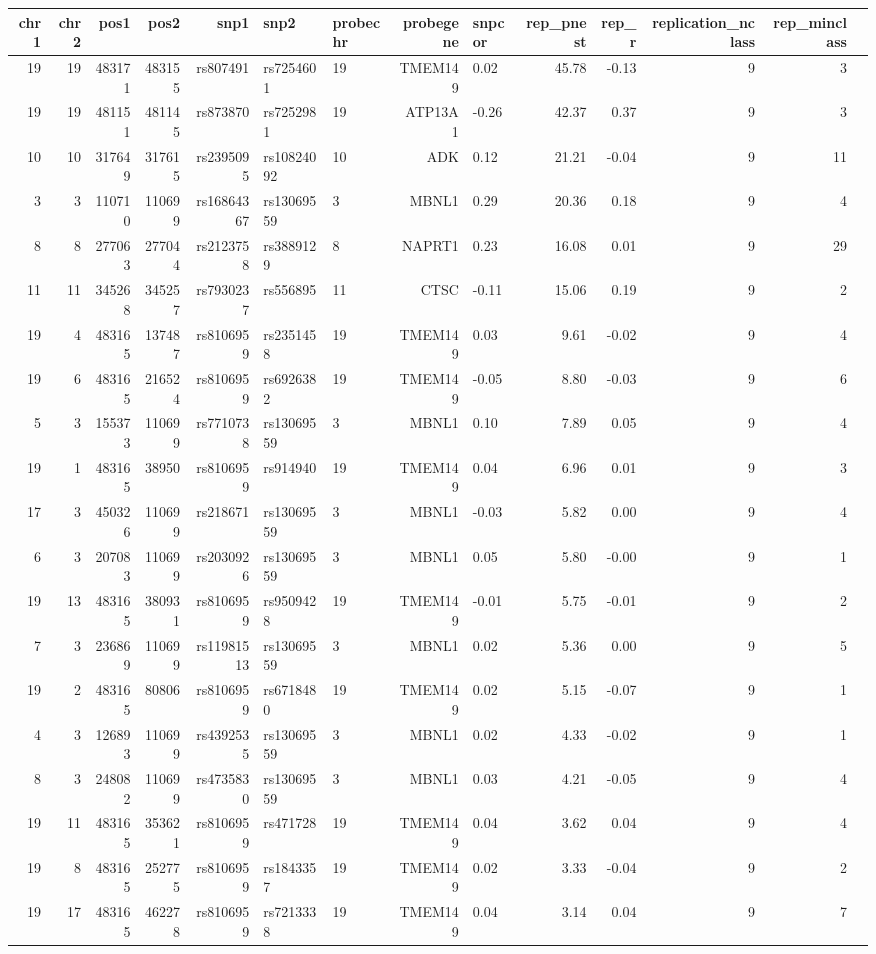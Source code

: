 \documentclass[paper=a4, fontsize=11pt]{scrartcl}	%
\numberwithin{equation}{section}									%
\numberwithin{figure}{section}										%
\numberwithin{table}{section}										%
\begin{document}
\begin{table}
\centering
{\footnotesize
\begin{tabular}{rrrrrllrlrrrrr}
  \hline
chr1 & chr2 & pos1 & pos2 & snp1 & snp2 & probechr & probegene & snpcor & rep\_pnest & rep\_r & replication\_nclass & rep\_minclass \\ 
  \hline
19 &  19 & 483171 & 483155 & rs807491 & rs7254601 &  19 & TMEM149 & 0.02 & 45.78 & -0.13 &   9 &   3 \\ 
19 &  19 & 481151 & 481145 & rs873870 & rs7252981 &  19 & ATP13A1 & -0.26 & 42.37 & 0.37 &   9 &   3 \\ 
10 &  10 & 317649 & 317615 & rs2395095 & rs10824092 &  10 & ADK & 0.12 & 21.21 & -0.04 &   9 &  11 \\ 
3 &   3 & 110710 & 110699 & rs16864367 & rs13069559 &   3 & MBNL1 & 0.29 & 20.36 & 0.18 &   9 &   4 \\ 
8 &   8 & 277063 & 277044 & rs2123758 & rs3889129 &   8 & NAPRT1 & 0.23 & 16.08 & 0.01 &   9 &  29 \\ 
11 &  11 & 345268 & 345257 & rs7930237 & rs556895 &  11 & CTSC & -0.11 & 15.06 & 0.19 &   9 &   2 \\ 
19 &   4 & 483165 & 137487 & rs8106959 & rs2351458 &  19 & TMEM149 & 0.03 & 9.61 & -0.02 &   9 &   4 \\ 
19 &   6 & 483165 & 216524 & rs8106959 & rs6926382 &  19 & TMEM149 & -0.05 & 8.80 & -0.03 &   9 &   6 \\ 
5 &   3 & 155373 & 110699 & rs7710738 & rs13069559 &   3 & MBNL1 & 0.10 & 7.89 & 0.05 &   9 &   4 \\ 
19 &   1 & 483165 & 38950 & rs8106959 & rs914940 &  19 & TMEM149 & 0.04 & 6.96 & 0.01 &   9 &   3 \\ 
17 &   3 & 450326 & 110699 & rs218671 & rs13069559 &   3 & MBNL1 & -0.03 & 5.82 & 0.00 &   9 &   4 \\ 
6 &   3 & 207083 & 110699 & rs2030926 & rs13069559 &   3 & MBNL1 & 0.05 & 5.80 & -0.00 &   9 &   1 \\ 
19 &  13 & 483165 & 380931 & rs8106959 & rs9509428 &  19 & TMEM149 & -0.01 & 5.75 & -0.01 &   9 &   2 \\ 
7 &   3 & 236869 & 110699 & rs11981513 & rs13069559 &   3 & MBNL1 & 0.02 & 5.36 & 0.00 &   9 &   5 \\ 
19 &   2 & 483165 & 80806 & rs8106959 & rs6718480 &  19 & TMEM149 & 0.02 & 5.15 & -0.07 &   9 &   1 \\ 
4 &   3 & 126893 & 110699 & rs4392535 & rs13069559 &   3 & MBNL1 & 0.02 & 4.33 & -0.02 &   9 &   1 \\ 
8 &   3 & 248082 & 110699 & rs4735830 & rs13069559 &   3 & MBNL1 & 0.03 & 4.21 & -0.05 &   9 &   4 \\ 
19 &  11 & 483165 & 353621 & rs8106959 & rs471728 &  19 & TMEM149 & 0.04 & 3.62 & 0.04 &   9 &   4 \\ 
19 &   8 & 483165 & 252775 & rs8106959 & rs1843357 &  19 & TMEM149 & 0.02 & 3.33 & -0.04 &   9 &   2 \\ 
19 &  17 & 483165 & 462278 & rs8106959 & rs7213338 &  19 & TMEM149 & 0.04 & 3.14 & 0.04 &   9 &   7 \\ 
   \hline
\end{tabular}
}
\end{table}
\end{document}
